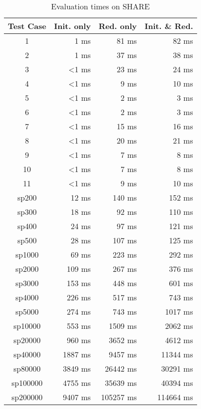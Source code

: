 \documentclass[11pt]{article}
\begin{document}
\begin{table}[H]
  \centering
  \begin{tabular}{| c | r | r |r |}
    \hline
    \textbf{Test Case} & \textbf{Init. only} & \textbf{Red. only} & \textbf{Init. \& Red.}\\
    \hline
    1        & 1 ms    & 81 ms & 82 ms\\
    2        & 1 ms    & 37 ms & 38 ms\\
    3        & <1 ms   & 23 ms & 24 ms\\
    4        & <1 ms   & 9 ms & 10 ms\\
    5        & <1 ms   & 2 ms  & 3 ms\\
    6        & <1 ms   & 2 ms  & 3 ms\\
    7        & <1 ms   & 15 ms & 16 ms\\
    8        & <1 ms   & 20 ms & 21 ms\\
    9        & <1 ms   & 7 ms  & 8 ms\\
    10       & <1 ms   & 7 ms  & 8 ms\\
    11       & <1 ms   & 9 ms  & 10 ms\\
    \hline
    sp200    & 12 ms   & 140 ms    & 152 ms\\
    sp300    & 18 ms   & 92 ms     & 110 ms\\
    sp400    & 24 ms   & 97 ms     & 121 ms\\
    sp500    & 28 ms   & 107 ms    & 125 ms\\
    sp1000   & 69 ms   & 223 ms    & 292 ms\\
    sp2000   & 109 ms  & 267 ms    & 376 ms\\
    sp3000   & 153 ms  & 448 ms    & 601 ms\\
    sp4000   & 226 ms  & 517 ms    & 743 ms\\
    sp5000   & 274 ms  & 743 ms    & 1017 ms\\
    sp10000  & 553 ms  & 1509 ms   & 2062 ms\\
    sp20000  & 960 ms  & 3652 ms   & 4612 ms\\
    sp40000  & 1887 ms & 9457 ms   & 11344 ms\\
    sp80000  & 3849 ms & 26442 ms  & 30291 ms\\
    sp100000 & 4755 ms & 35639 ms  & 40394 ms\\
    sp200000 & 9407 ms & 105257 ms & 114664 ms\\
    \hline
  \end{tabular}
  \caption{Evaluation times on SHARE}
  \label{tab:eval-times}
\end{table}
\end{document}
